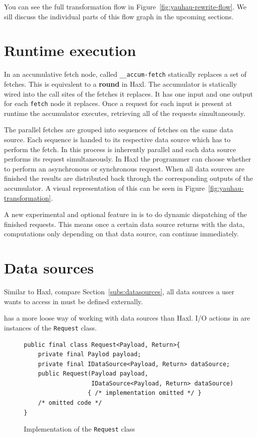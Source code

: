 You can see the full \yauhau{} transformation flow in Figure~\ref{fig:yauhau-rewrite-flow}.
We sill discuss the individual parts of this flow graph in the upcoming sections.

\section{Runtime execution}

In \yauhau{} an accumulative fetch node, called \texttt{\_\_accum-fetch} statically replaces a set of fetches.
This is equivalent to a \textbf{round} in Haxl.
The accumulator is statically wired into the call sites of the fetches it replaces.
It has one input and one output for each \texttt{fetch} node it replaces.
Once a request for each input is present at runtime the accumulator executes, retrieving all of the requests simultaneously.

The parallel fetches are grouped into sequences of fetches on the same data source.
Each sequence is handed to its respective data source which has to perform the fetch.
In \yauhau{} this process is inherently parallel and each data source performs its request simultaneously.
In Haxl the programmer can choose whether to perform an asynchronous or synchronous request.
When all data sources are finished the results are distributed back through the corresponding outputs of the accumulator.
A visual representation of this can be seen in Figure~\ref{fig:yauhau-transformation}.

A new experimental and optional feature in \yauhau{} is to do dynamic dispatching of the finished requests.
This means once a certain data source returns with the data, computations only depending on that data source, can continue immediately.

\section{Data sources}

Similar to Haxl, compare Section~\ref{subs:datasources}, all data sources a user wants to access in \yauhau{} must be defined externally.

\yauhau{} has a more loose way of working with data sources than Haxl.
I/O actions in \yauhau{} are instances of the \texttt{Request} class.

\begin{figure}[h]
\begin{verbatim}
public final class Request<Payload, Return>{
    private final Paylod payload;
    private final IDataSource<Payload, Return> dataSource;
    public Request(Payload payload,
                   IDataSource<Payload, Return> dataSource)
                  { /* implementation omitted */ }
    /* omitted code */
}
\end{verbatim}
\caption{Implementation of the \texttt{Request} class}
\label{fig:request-class-implementation}
\end{figure}

